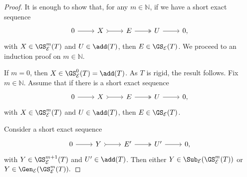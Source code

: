 \begin{proof}
It is enough to show that, for any $m \in \mathbb{N}$, if we have a short exact sequence \[\begin{tikzcd}
	    0 & X & E  & U &  0,
	\arrow[from=1-1, to=1-2]
	\arrow[tail, from=1-2, to=1-3]
	\arrow[two heads,from=1-3, to=1-4]
	\arrow[from=1-4, to=1-5]
\end{tikzcd} \] with $X\in \GS^m_{\mathcal{E}}(T)$ and $U \in \add(T)$, then $E \in  \GS_{\mathcal{E}}(T)$. We proceed to an induction proof on $m \in \mathbb{N}$. 

If $m=0$, then $X \in \GS^0_{\mathcal{E}}(T) = \add(T)$. As $T$ is rigid, the result follows. Fix $m \in \mathbb{N}$. Assume that if there is a short exact sequence \[\begin{tikzcd}
	0 & X & E  & U &  0,
	\arrow[from=1-1, to=1-2]
	\arrow[tail, from=1-2, to=1-3]
	\arrow[two heads,from=1-3, to=1-4]
	\arrow[from=1-4, to=1-5]
\end{tikzcd} \] with $X \in \GS^{m}_{\mathcal{E}}(T)$ and $U \in \add(T)$, then $E \in \GS_{\mathcal{E}}(T)$.

Consider a short exact sequence \[\begin{tikzcd}
	0 & Y & E'  & U' &  0,
	\arrow[from=1-1, to=1-2]
	\arrow[tail, from=1-2, to=1-3]
	\arrow[two heads,from=1-3, to=1-4]
	\arrow[from=1-4, to=1-5]
\end{tikzcd} \] with $Y \in \GS^{m+1}_{\mathcal{E}}(T)$ and $U' \in \add(T)$. Then either $Y \in \Sub_\mathcal{E}(\GS^{m}_{\mathcal{E}}(T))$ or $Y \in \Gen_\mathcal{E}(\GS^{m}_{\mathcal{E}}(T)).$


\end{proof}
